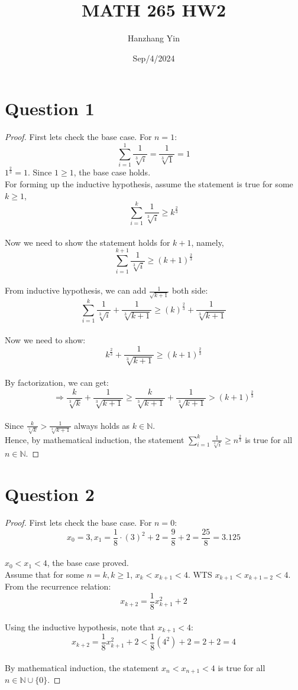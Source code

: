 \documentclass{article}
\title{MATH 265 HW2}
\author{Hanzhang Yin}
\date{Sep/4/2024}
\begin{document}
\maketitle

\section*{Question 1}
\begin{proof}
    First lets check the base case. For $n = 1$: 
    \[ \sum_{i=1}^{1} \frac{1}{\sqrt[3]{i}} = \frac{1}{\sqrt[3]{1}} = 1 \]
    $1^{\frac{2}{3}} = 1$. Since $1 \geq 1$, the base case holds.
    \\
    For forming up the inductive hypothesis, assume the statement is true for some $k \geq 1$, 
    \[ \sum_{i=1}^{k} \frac{1}{\sqrt[3]{i}} \geq k^{\frac{2}{3}}  \]
    \\
    Now we need to show the statement holds for $k + 1$, namely, 
    \[ \sum_{i=1}^{k+1} \frac{1}{\sqrt[3]{i}} \geq (k + 1)^{\frac{2}{3}} \]
    \\
    From inductive hypothesis, we can add $\frac{1}{\sqrt{k+1}}$ both side:
    \[ \sum_{i=1}^{k} \frac{1}{\sqrt[3]{i}} + \frac{1}{\sqrt[3]{k + 1}} \geq (k)^{\frac{2}{3}} + \frac{1}{\sqrt[3]{k + 1}} \]
    \\
    Now we need to show:
    \[ k^{\frac{2}{3}} + \frac{1}{\sqrt[3]{k + 1}} \geq (k + 1)^{\frac{2}{3}} \]
    \\
    By factorization, we can get:
    \[ \Rightarrow \frac{k}{\sqrt[3]{k}} + \frac{1}{\sqrt[3]{k + 1}} \geq \frac{k}{\sqrt[3]{k + 1}} + \frac{1}{\sqrt[3]{k + 1}} > (k + 1)^{\frac{2}{3}} \]
    \\
    Since $\frac{k}{\sqrt[3]{k}} > \frac{1}{\sqrt[3]{k + 1}}$ always holds as $k \in \mathbb{N}$.
    \\
    Hence, by mathematical induction, the statement \( \sum_{i=1}^{k} \frac{1}{\sqrt[3]{i}} \geq n^{\frac{2}{3}} \) is true for all $n \in \mathbb{N}$.
\end{proof}

\section*{Question 2}
\begin{proof}
    First lets check the base case. For $n = 0$: 
    \[ x_0 = 3, x_1 = \frac{1}{8} \cdot (3)^2 + 2 = \frac{9}{8} + 2 = \frac{25}{8} = 3.125 \]
    \\
    $x_0 < x_1 < 4$, the base case proved.
    \\
    Assume that for some $n = k, k \geq 1$, $x_k < x_{k+1} < 4$. WTS $x_{k+1} < x_{k+1=2} < 4$. 
    \\
    From the recurrence relation: \[ x_{k+2} = \frac{1}{8}x^2_{k+1} + 2 \]
    \\
    Using the inductive hypothesis, note that $x_{k+1} < 4$:
    \[ x_{k+2} = \frac{1}{8}x^2_{k+1} + 2 < \frac{1}{8}(4^2) + 2 = 2 + 2 = 4 \]
    \\
    By mathematical induction, the statement $x_{n} < x_{n + 1} < 4$ is true for all $n \in \mathbb{N} \cup \{0\}$.
\end{proof}
\end{document}
